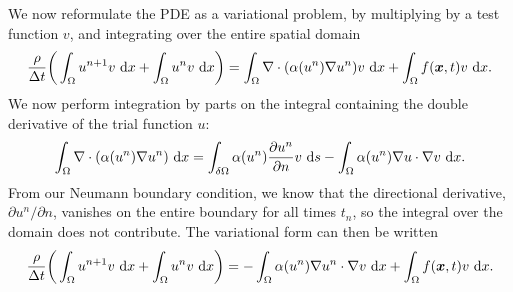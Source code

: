 \documentclass[a4paper, 11pt, notitlepage, english]{article}
\renewcommand{\d}{{\rm d}}
\newcommand{\bt}[1]{\boldsymbol{#1}}
\newcommand{\p}{\partial}
\begin{document}
We now reformulate the PDE as a variational problem, by multiplying by a test function $v$, and integrating over the entire spatial domain
$$\frac{\rho}{\Delta t}\bigg(\int_\Omega u^{n+1}v \ \d x + \int_{\Omega} u^n v \ \d x\bigg) = \int_\Omega \nabla \cdot (\alpha(u^n)\nabla u^n) v \ \d x + \int_\Omega f(\bt{x}, t)v \ \d x.$$
We now perform integration by parts on the integral containing the double derivative of the trial function $u$:
$$\int_\Omega \nabla \cdot (\alpha(u^n)\nabla u^n) \ \d x = \int_{\delta \Omega} \alpha(u^n) \frac{\p u^n}{\p n} v \ \d s - \int_\Omega \alpha(u^n)\nabla u \cdot \nabla v \ \d x.$$
From our Neumann boundary condition, we know that the directional derivative, $\p u^n /\p n$, vanishes on the entire boundary for all times $t_n$, so the integral over the domain does not contribute. The variational form can then be written
$$\frac{\rho}{\Delta t}\bigg(\int_\Omega u^{n+1}v \ \d x + \int_{\Omega} u^n v \ \d x\bigg) = -\int_\Omega \alpha(u^n)\nabla u^n \cdot \nabla v \ \d x + \int_\Omega f(\bt{x}, t)v \ \d x.$$
\end{document}

